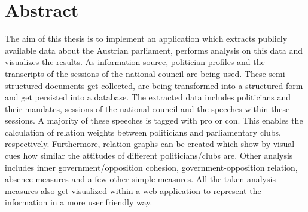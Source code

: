 

\chapter*{Abstract}

The aim of this thesis is to implement an application which extracts publicly available data about the Austrian parliament, performs analysis on this data and visualizes the results. As information source, politician profiles and the transcripts of the sessions of the national council are being used. These semi-structured documents get collected, are being transformed into a structured form and get persisted into a database. The extracted data includes politicians and their mandates, sessions of the national council and the speeches within these sessions. A majority of these speeches is tagged with pro or con. This enables the calculation of relation weights between politicians and parliamentary clubs, respectively. Furthermore, relation graphs can be created which show by visual cues how similar the attitudes of different politicians/clubs are. Other analysis includes inner government/opposition cohesion, government-opposition relation, absence measures and a few other simple measures. All the taken analysis measures also get visualized within a web application to represent the information in a more user friendly way.